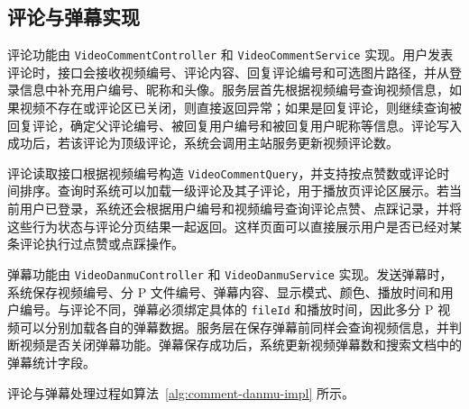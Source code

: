 \subsection{评论与弹幕实现}

评论功能由 \texttt{VideoCommentController} 和 \texttt{VideoCommentService} 实现。用户发表评论时，接口会接收视频编号、评论内容、回复评论编号和可选图片路径，并从登录信息中补充用户编号、昵称和头像。服务层首先根据视频编号查询视频信息，如果视频不存在或评论区已关闭，则直接返回异常；如果是回复评论，则继续查询被回复评论，确定父评论编号、被回复用户编号和被回复用户昵称等信息。评论写入成功后，若该评论为顶级评论，系统会调用主站服务更新视频评论数。

评论读取接口根据视频编号构造 \texttt{VideoCommentQuery}，并支持按点赞数或评论时间排序。查询时系统可以加载一级评论及其子评论，用于播放页评论区展示。若当前用户已登录，系统还会根据用户编号和视频编号查询评论点赞、点踩记录，并将这些行为状态与评论分页结果一起返回。这样页面可以直接展示用户是否已经对某条评论执行过点赞或点踩操作。

弹幕功能由 \texttt{VideoDanmuController} 和 \texttt{VideoDanmuService} 实现。发送弹幕时，系统保存视频编号、分 P 文件编号、弹幕内容、显示模式、颜色、播放时间和用户编号。与评论不同，弹幕必须绑定具体的 \texttt{fileId} 和播放时间，因此多分 P 视频可以分别加载各自的弹幕数据。服务层在保存弹幕前同样会查询视频信息，并判断视频是否关闭弹幕功能。弹幕保存成功后，系统更新视频弹幕数和搜索文档中的弹幕统计字段。

评论与弹幕处理过程如算法~\ref{alg:comment-danmu-impl} 所示。

